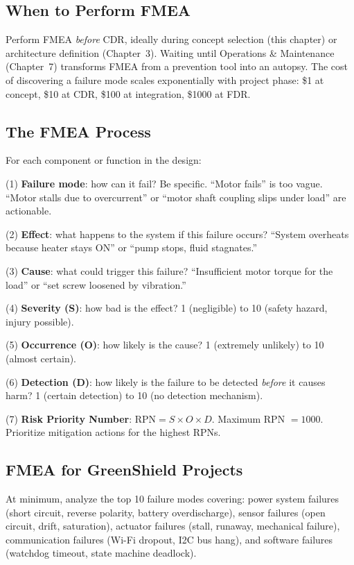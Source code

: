 \subsection{When to Perform FMEA}
Perform FMEA \emph{before} CDR, ideally during concept selection (this chapter) or architecture definition (Chapter~3). Waiting until Operations \& Maintenance (Chapter~7) transforms FMEA from a prevention tool into an autopsy. The cost of discovering a failure mode scales exponentially with project phase: \$1 at concept, \$10 at CDR, \$100 at integration, \$1000 at FDR.

\subsection{The FMEA Process}
For each component or function in the design:

(1) \textbf{Failure mode}: how can it fail? Be specific. ``Motor fails'' is too vague. ``Motor stalls due to overcurrent'' or ``motor shaft coupling slips under load'' are actionable.

(2) \textbf{Effect}: what happens to the system if this failure occurs? ``System overheats because heater stays ON'' or ``pump stops, fluid stagnates.''

(3) \textbf{Cause}: what could trigger this failure? ``Insufficient motor torque for the load'' or ``set screw loosened by vibration.''

(4) \textbf{Severity (S)}: how bad is the effect? 1 (negligible) to 10 (safety hazard, injury possible).

(5) \textbf{Occurrence (O)}: how likely is the cause? 1 (extremely unlikely) to 10 (almost certain).

(6) \textbf{Detection (D)}: how likely is the failure to be detected \emph{before} it causes harm? 1 (certain detection) to 10 (no detection mechanism).

(7) \textbf{Risk Priority Number}: $\text{RPN} = S \times O \times D$. Maximum RPN $= 1000$. Prioritize mitigation actions for the highest RPNs.

\subsection{FMEA for GreenShield Projects}
At minimum, analyze the top 10 failure modes covering: power system failures (short circuit, reverse polarity, battery overdischarge), sensor failures (open circuit, drift, saturation), actuator failures (stall, runaway, mechanical failure), communication failures (Wi-Fi dropout, I2C bus hang), and software failures (watchdog timeout, state machine deadlock).

